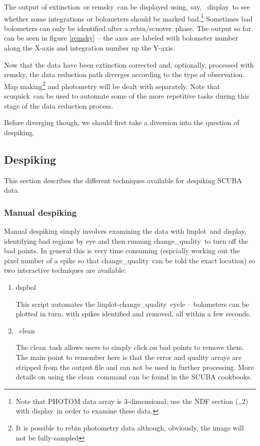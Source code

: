 \documentclass[twoside,11pt]{article}
\newcommand{\Kappa}{\xref{{\sc{Kappa}}}{sun95}{}}
\newcommand{\Figaro}{\xref{{\sc{Figaro}}}{sun86}{}}
\newcommand{\task}[1]{{\sf #1}}
\newcommand{\rebin}{\htmlref{\task{rebin}}{REBIN}}
\newcommand{\chgqual}{\htmlref{\task{change\_quality}}{CHANGE_QUALITY}}
\newcommand{\ext}{\htmlref{\task{extinction}}{EXTINCTION}}
\newcommand{\scuquick}{\htmlref{\task{scuquick}}{SCUQUICK}}
\newcommand{\remsky}{\htmlref{\task{remsky}}{REMSKY}}
\newcommand{\scuover}{\htmlref{\task{scuover}}{SCUOVER}}
\newcommand{\dspbol}{\htmlref{\task{dspbol}}{DSPBOL}}
\newcommand{\display}{\xref{\task{display}}{sun95}{DISPLAY}}
\newcommand{\linplot}{\xref{\task{linplot}}{sun95}{LINPLOT}}
\newcommand{\clean}{\xref{\task{clean}}{sun86}{CLEAN}}
\newcommand{\htmlref}[2]{#1}
\newcommand{\xref}[3]{#1}
\begin{document}
The output of \ext\ or \remsky\ can be displayed using, say, \Kappa\
\display\ to see whether some integrations or bolometers should be marked
bad.\footnote{Note that PHOTOM data array is 3-dimensional; use the NDF
section (,,2) with \display\ in order to examine these data.} Sometimes bad
bolometers can only be identified after a \rebin/\scuover\ phase. The output
so far can be seen in figure \ref{remsky} -- the axes are labeled with
bolometer number along the X-axis and integration number up the Y-axis.

Now that the data have been extinction corrected and, optionally, processed
with \remsky, the data reduction path diverges according to the type of
observation. Map making\footnote{It is possible to rebin photometry data
although, obviously, the image will not be fully-sampled} and photometry will
be dealt with separately. Note that \scuquick\ can be used to automate some of
the more repetitive tasks during this stage of the data reduction process.

Before diverging though, we should first take a diversion into the question of
despiking.

\subsection{Despiking}

This section describes the different techniques available for despiking
SCUBA data.

\subsubsection{Manual despiking}

Manual despiking simply involves examining the data with \linplot\ and
\display, identifying bad regions by eye and then running \chgqual\ to
turn off the bad points. In general this is very time consuming (espcially
working out the pixel number of a spike so that \chgqual\ can be told the
exact location) so two interactive techniques are available:

\begin{enumerate}

\item \dspbol

This script automates the \linplot-\chgqual\ cycle -- bolometers can be plotted 
in turn, with spikes identified and removed, all within a few seconds.

\item \Figaro\ \clean

The \clean\ task allows users to simply click on bad points to remove them.
The main point to remember here is that the error and quality arrays are
stripped from the output file and can not be used in further processing.  More
details on using the \clean\ command can be found in the SCUBA cookbooks.


\end{enumerate}
\end{document}
